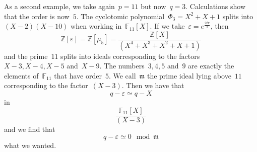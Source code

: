 \begin{example}
  As a second example, we take again~${p = 11}$ but now~${q = 3}$. Calculations show that the order is now~$5$. The cyclotomic polynomial~${\Phi_3 = X^2 + X + 1}$ splits into~${(X - 2)(X - 10)}$ when working in~${\mathbb{F}_{11}[X]}$. If we take~${\varepsilon = e^{\frac{2i\pi}{5}}}$, then
  \begin{equation}
    \mathbb{Z}[\varepsilon] = \mathbb{Z}[\mu_5] = \frac{\mathbb{Z}[X]}{(X^4 + X^3 + X^2 + X + 1)} 
  \end{equation}
  and the prime~$11$ splits into ideals corresponding to the factors~${X - 3, X - 4, X - 5}$ and~${X - 9}$. The numbers~${3,4,5}$ and~${9}$ are exactly the elements of~${\mathbb{F}_{11}}$ that have order~$5$. We call~${\mathfrak{m}}$ the prime ideal lying above~$11$ corresponding to the factor~${(X - 3)}$. Then we have that
  \begin{equation}
    q - \varepsilon \simeq q - X 
  \end{equation}
  in
  \begin{equation}
    \frac{\mathbb{F}_{11}[X]}{(X-3)}  
  \end{equation}
  and we find that
  \begin{equation}
    q - \varepsilon \simeq 0 \mod \mathfrak{m}  
  \end{equation}
  what we wanted.
\end{example}
